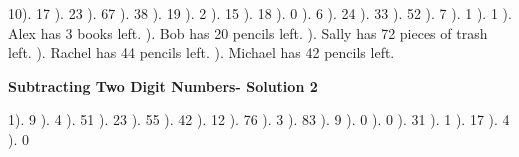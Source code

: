 \documentclass{article}%
\begin{document}
10). 17%
). 23%
). 67%
). 38%
). 19%
). 2%
). 15%
). 18%
). 0%
). 6%
). 24%
). 33%
). 52%
). 7%
). 1%
). 1%
). Alex has 3 books left.%
). Bob has 20 pencils left.%
). Sally has 72 pieces of trash left.%
). Rachel has 44 pencils left.%
). Michael has 42 pencils left.%
\newline%
\newpage%
\large%
\begin{center}%
\textbf{Subtracting Two Digit Numbers- Solution 2}%
\newline%
\end{center} \normalsize%
1). 9%
). 4%
). 51%
). 23%
). 55%
). 42%
). 12%
). 76%
). 3%
). 83%
). 9%
). 0%
). 0%
). 31%
). 1%
). 17%
). 4%
). 0%
\newline%
\end{document}
